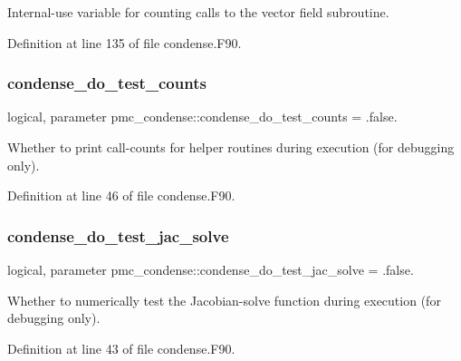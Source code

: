 Internal-\/use variable for counting calls to the vector field subroutine. 



Definition at line 135 of file condense.\+F90.

\mbox{\label{namespacepmc__condense_ab969e806479179fa28b147414b3677a1}} 
\subsubsection{\texorpdfstring{condense\+\_\+do\+\_\+test\+\_\+counts}{condense\_do\_test\_counts}}
{\footnotesize\ttfamily logical, parameter pmc\+\_\+condense\+::condense\+\_\+do\+\_\+test\+\_\+counts = .false.}



Whether to print call-\/counts for helper routines during execution (for debugging only). 



Definition at line 46 of file condense.\+F90.

\mbox{\label{namespacepmc__condense_ac7de3176ecbf47a23e0278ff57fed802}} 
\subsubsection{\texorpdfstring{condense\+\_\+do\+\_\+test\+\_\+jac\+\_\+solve}{condense\_do\_test\_jac\_solve}}
{\footnotesize\ttfamily logical, parameter pmc\+\_\+condense\+::condense\+\_\+do\+\_\+test\+\_\+jac\+\_\+solve = .false.}



Whether to numerically test the Jacobian-\/solve function during execution (for debugging only). 



Definition at line 43 of file condense.\+F90.

\mbox{\label{namespacepmc__condense_ae50824c600d52bf42b1ba4662d5ca40e}} 
